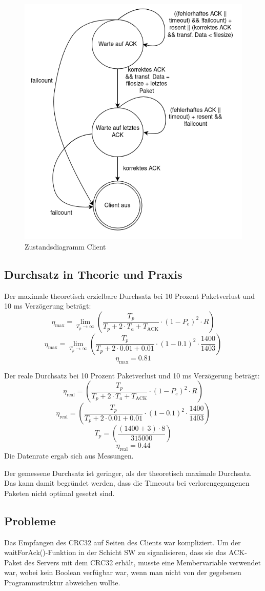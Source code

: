 \documentclass{article}
\begin{document}
\begin{figure}[H]
    \centering
    \includegraphics[width=0.6\linewidth]{Client_Zustandsdiagramm.png}
    \caption{Zustandsdiagramm Client}
    \label{fig:client}
\end{figure}

\subsection{Durchsatz in Theorie und Praxis}
Der maximale theoretisch erzielbare Durchsatz bei 10 Prozent Paketverlust und 10 ms Verzögerung beträgt:
\[\eta_{\text{max}} = \lim_{{T_p \to \infty}} \left( \frac{T_p}{{T_p + 2 \cdot T_a + T_{\text{ACK}}}} \cdot (1 - P_e)^2  \cdot R\right)\]
\[\eta_{\text{max}} = \lim_{{T_p \to \infty}} \left( \frac{T_p}{{T_p + 2 \cdot 0.01  + 0.01}} \cdot (1 - 0.1)^2 \cdot {\frac{1400}{1403}}\right)\]
\[\eta_{\text{max}} = 0.81\]

Der reale Durchsatz bei 10 Prozent Paketverlust und 10 ms Verzögerung beträgt:
\[\eta_{\text{real}} = \left( \frac{T_p}{{T_p + 2 \cdot T_a  + T_{\text{ACK}}}} \cdot (1 - P_e)^2 \cdot R\right)\]
\[\eta_{\text{real}} = \left( \frac{T_p}{{T_p + 2 \cdot 0.01  + 0.01}} \cdot (1 - 0.1)^2 \cdot {\frac{1400}{1403}} \right)\]
\[T_p = \left( \frac{(1400+3)\cdot 8}{315000} \right)\]
\[\eta_{\text{real}} = 0.44\]
Die Datenrate ergab sich aus Messungen.

Der gemessene Durchsatz ist geringer, als der theoretisch maximale Durchsatz. Das kann damit begründet werden, dass die Timeouts bei verlorengegangenen Paketen nicht optimal gesetzt sind.  

\subsection{Probleme}
Das Empfangen des CRC32 auf Seiten des Clients war kompliziert. Um der waitForAck()-Funktion in der Schicht SW zu signalisieren, dass sie das ACK-Paket des Servers mit dem CRC32 erhält, musste eine Membervariable verwendet war, wobei kein Boolean verfügbar war, wenn man nicht von der gegebenen Programmstruktur abweichen wollte.
\end{document}
